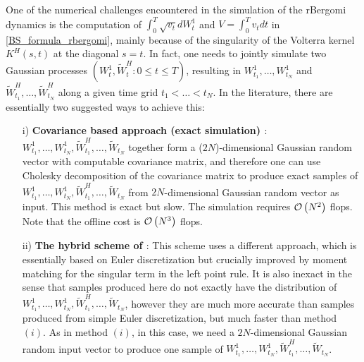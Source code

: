 One of the numerical challenges encountered in the simulation of the rBergomi dynamics  is the computation of  $\int_{0}^{T} \sqrt{v_t} dW_t^1$ and $V=\int_{0}^{T} v_t dt$ in \eqref{BS_formula_rbergomi}, mainly because of the singularity of the Volterra kernel $K^H(s,t)$ at the diagonal $s = t$. In fact,  one needs to jointly simulate two Gaussian processes $(W_t^1, \widetilde{W}^H_t: 0 \le t \le T)$, resulting in $W^1_{t_1},\dots, W^1_{t_N}$ and $\widetilde{W}^H_{t_1},\dots, \widetilde{W}^H_{t_N}$ along a given time grid $t_1 <\dots < t_N$. In the literature, there are essentially two suggested ways to achieve this:
 \begin{enumerate}
 	
 	\item[i)] \textbf{Covariance based approach (exact simulation) \cite{bayer2016pricing,bayer2018short}}: $W^1_{t_1},\dots, W^1_{t_N}, \widetilde{W}^H_{t_1},\dots, \widetilde{W}_{t_N}$ together form a ($2N$)-dimensional Gaussian random vector with computable covariance matrix, and therefore one can use Cholesky decomposition of the covariance matrix to produce exact samples of $W^1_{t_1},\dots, W^1_{t_N}, \widetilde{W}^H_{t_1},\dots, \widetilde{W}_{t_N}$ from $2 N$-dimensional Gaussian random vector as  input. This method is exact but slow. The simulation  requires ${\mathcal{O}}\left(N^2\right)$ flops. Note that the offline cost is ${\mathcal{O}}\left(N^3\right)$ flops.
 	
 	\item[ii)]  \textbf{The hybrid scheme of \cite{bennedsen2017hybrid}}: This scheme uses a different approach, which is essentially based on  Euler discretization  but crucially improved by moment
 	matching for the singular term in the left point rule. It is also
 	inexact in the sense that samples produced here do not exactly have the distribution of $W^1_{t_1},\dots, W^1_{t_N}, \widetilde{W}^H_{t_1},\dots, \widetilde{W}_{t_N}$, however they are much more accurate than samples produced from simple Euler discretization, but much faster than method $(i)$. As in method $(i)$, in this case, we need a $2 N$-dimensional Gaussian random input vector to produce one 	sample of $W^1_{t_1},\dots, W^1_{t_N}, \widetilde{W}^H_{t_1},\dots, \widetilde{W}_{t_N}$.
 \end{enumerate} 

